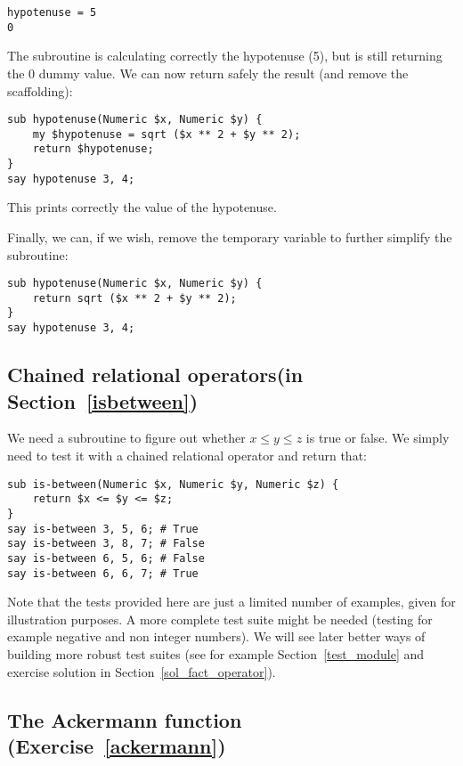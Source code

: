 \begin{verbatim}
hypotenuse = 5
0
\end{verbatim}
%

The subroutine is calculating correctly the hypotenuse (5), 
but is still returning the 0 dummy value. We can now return 
safely the result (and remove the scaffolding):

\begin{verbatim}
sub hypotenuse(Numeric $x, Numeric $y) {
    my $hypotenuse = sqrt ($x ** 2 + $y ** 2);
    return $hypotenuse;
}
say hypotenuse 3, 4;
\end{verbatim}
%

This prints correctly the value of the hypotenuse.

Finally, we can, if we wish, remove the temporary variable 
to further simplify the subroutine:
\begin{verbatim}
sub hypotenuse(Numeric $x, Numeric $y) {
    return sqrt ($x ** 2 + $y ** 2);
}
say hypotenuse 3, 4;
\end{verbatim}
%

\subsection{Chained relational operators(in Section~\ref{isbetween})}
\label{sol_isbetween}

We need a subroutine to figure out whether $x \le y \le z$ 
is true or false. We simply need to test it with a chained relational operator and return that:

\begin{verbatim}
sub is-between(Numeric $x, Numeric $y, Numeric $z) {
    return $x <= $y <= $z;
}
say is-between 3, 5, 6; # True
say is-between 3, 8, 7; # False
say is-between 6, 5, 6; # False
say is-between 6, 6, 7; # True
\end{verbatim}
%

Note that the tests provided here are just a limited number of 
examples, given for illustration purposes. A more complete test 
suite might be needed (testing for example negative and non 
integer numbers). We will see later better ways 
of building more robust test suites (see for example 
Section~\ref{test_module} and exercise 
solution in Section~\ref{sol_fact_operator}).


\subsection{The Ackermann function (Exercise~\ref{ackermann})}
\label{sol_ackermann}

